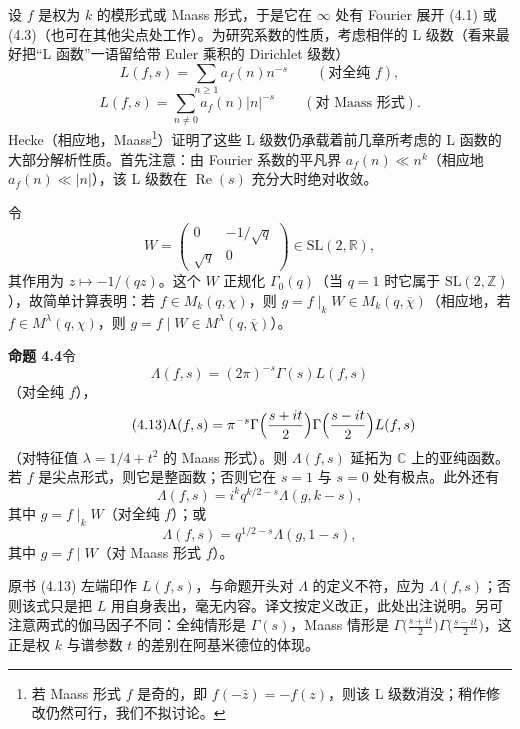 设 $f$ 是权为 $k$ 的模形式或 Maass 形式，于是它在 $\infty$ 处有 Fourier 展开 (4.1) 或 (4.3)（也可在其他尖点处工作）。为研究系数的性质，考虑相伴的 L 级数（看来最好把“L 函数”一语留给带 Euler 乘积的 Dirichlet 级数）
\begin{equation}\tag{4.11}\label{c3:eq:4.11}
L(f,s)=\sum_{n\ge1}a_{f}(n)n^{-s}\qquad(\text{对全纯 }f),
\end{equation}
\begin{equation}\tag{4.12}\label{c3:eq:4.12}
L(f,s)=\sum_{n\ne0}a_{f}(n)|n|^{-s}\qquad(\text{对 Maass 形式}).
\end{equation}
Hecke（相应地，Maass\footnote{若 Maass 形式 $f$ 是奇的，即 $f(-\bar z)=-f(z)$，则该 L 级数消没；稍作修改仍然可行，我们不拟讨论。}）证明了这些 L 级数仍承载着前几章所考虑的 L 函数的大部分解析性质。首先注意：由 Fourier 系数的平凡界 $a_{f}(n)\ll n^{k}$（相应地 $a_{f}(n)\ll|n|$），该 L 级数在 $\operatorname{Re}(s)$ 充分大时绝对收敛。

令
\[
W=\begin{pmatrix}0&-1/\sqrt{q}\\ \sqrt{q}&0\end{pmatrix}\in\mathrm{SL}(2,\mathbb{R}),
\]
其作用为 $z\mapsto-1/(qz)$。这个 $W$ 正规化 $\Gamma_{0}(q)$（当 $q=1$ 时它属于 $\mathrm{SL}(2,\mathbb{Z})$），故简单计算表明：若 $f\in M_{k}(q,\chi)$，则 $g=f\mid_{k}W\in M_{k}(q,\overline{\chi})$（相应地，若 $f\in M^{\lambda}(q,\chi)$，则 $g=f\mid W\in M^{\lambda}(q,\overline{\chi})$）。

\par\medskip\noindent\textbf{命题 4.4}\quad 令
\[
\Lambda(f,s)=(2\pi)^{-s}\Gamma(s)L(f,s)
\]
（对全纯 $f$），
\begin{equation}\tag{4.13}\label{c3:eq:4.13}
\Lambda(f,s)=\pi^{-s}\Gamma\Bigl(\frac{s+it}{2}\Bigr)\Gamma\Bigl(\frac{s-it}{2}\Bigr)L(f,s)
\end{equation}
（对特征值 $\lambda=1/4+t^{2}$ 的 Maass 形式）。则 $\Lambda(f,s)$ 延拓为 $\mathbb{C}$ 上的亚纯函数。若 $f$ 是尖点形式，则它是整函数；否则它在 $s=1$ 与 $s=0$ 处有极点。此外还有
\[
\Lambda(f,s)=i^{k}q^{k/2-s}\Lambda(g,k-s),
\]
其中 $g=f\mid_{k}W$（对全纯 $f$）；或
\[
\Lambda(f,s)=q^{1/2-s}\Lambda(g,1-s),
\]
其中 $g=f\mid W$（对 Maass 形式 $f$）。

\begin{annote}
原书 (4.13) 左端印作 $L(f,s)$，与命题开头对 $\Lambda$ 的定义不符，应为 $\Lambda(f,s)$；否则该式只是把 $L$ 用自身表出，毫无内容。译文按定义改正，此处出注说明。另可注意两式的伽马因子不同：全纯情形是 $\Gamma(s)$，Maass 情形是 $\Gamma\bigl(\frac{s+it}{2}\bigr)\Gamma\bigl(\frac{s-it}{2}\bigr)$，这正是权 $k$ 与谱参数 $t$ 的差别在阿基米德位的体现。
\par\vspace{0.15em}{\raggedleft 【来源：原书 §4.3（A）；Iwaniec《Topics in Classical Automorphic Forms》第 5 章（A）】\par}
\end{annote}

